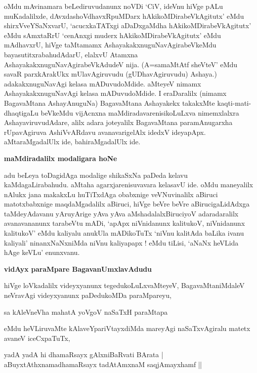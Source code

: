 \noindent
oMdu mAvinamara beLediruvudanunx noVDi `CiV, ideVnu hiVge pALu muKadalilxde, dAvxdashoVdhavxRpuMDarx hAkikoMDirabeVkAgitutx' eMdu shirxVveYSaNxvarU, `acucxkaTATxgi aDaDxgaMdha hAkikoMDirabeVkAgitutx' eMdu sAmxtaRrU `cenAnxgi muderx hAkikoMDirabeVkAgitutx' eMdu mAdhavxrU, hiVge taMtamamx AshayakakxnuguNavAgirabeVkeMdu bayasutitxrabahudAdarU, elalxvU Atamxna AshayakakxnuguNavAgirabeVkAdudeV nija. (A=samaMtAtf sheVteV' eMdu savaR parxkArakUkx mUlavAgiruvudu (gUDhavAgiruvudu) Ashaya.) adakakxnuguNavAgi kelasa mADuvudoMdide. aMteyeV nimamx AshayakakxnuguNavAgi kelasa mADuvudoMdide. I eraDaralilx (nimamx BagavaMtana AshayAnuguNa) BagavaMtana Ashayakekx takakxMte kaqti-mati-dhaqtigaLu beVkeMdu vijAcnxna maMdiradavarenisikoLuLxva nimemxlalxra AshayaviruvudAdare, alilx adara joteyalilx BagavaMtana paramAnugarxha rUpavAgiruva AshiVvARdavu avanavarigelAlx idedxV ideyapApx. aMtaraMgadalUlx ide, bahiraMgadalUlx ide. 

{\bigskip
\noindent
{\large\bf maMdiradalilx modaligara hoNe}}\label{page70a}
\medskip

\noindent
adu beLeya toDagidAga modalige shikaSxNa paDeda kelavu kaMdagaLirabahudu. aMtaha agarxjarenisuvavara kelasavU ide. oMdu maneyalilx nAlukx jana makakxLu huTiTxdAga obabxnige veVNuvinalilx aBiruci matotxbabxnige maqdaMgadalilx aBiruci, hiVge beVre beVre aBirucigaLidAdxga taMdeyAdavanu yAruyArige yAva yAva aMshadalalxBiruciyoV adaradaralilx avanavananunx tarabeVtu mADi, `apApx niVnidanunx kalitukoV, niVnidanunx kalitukoV' eMdu kaliyalu anukUla mADikoTuTx `niVnu kalitAda baLika ivanu kaliyali' ninanxNaNxniMda niVnu kaliyapapx ! eMdu tiLisi, `aNaNx heVLida hAge keVLu' enunxvanu.

{\bigskip
\noindent
{\large\bf vidAyx paraMpare BagavanUmxlavAdudu}}\label{page70b}
\medskip

\noindent
hiVge loVkadalilx videyxyanunx tegedukoLuLxvaMteyeV, BagavaMtaniMdaleV neVravAgi videyxyanunx paDedukoMDa paraMpareyu,

\begin{shloka}
sa kAleVneVha mahatA yoVgoV naSaTxH paraMtapa\label{70}
\end{shloka}

eMdu heVLiruvaMte kAlaveYpariVtayxdiMda mareyAgi naSaTxvAgiralu matetx avaneV iceCxpaTuTx,

\begin{shloka}
yadA yadA hi dhamaRsayx gAlxniBaRvati BArata |\\\label{71}
aBuyxtAthxnamadhamaRsayx tadAtAmxnaM saqjAmayxhamf ||
\end{shloka}

